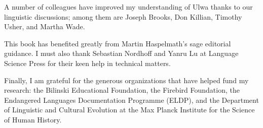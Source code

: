 A number of colleagues have improved my understanding of Ulwa thanks to our linguistic discussions; among them are Joseph Brooks, Don Killian, Timothy Usher, and Martha Wade.

This book has benefited greatly from Martin Haspelmath’s sage editorial guidance. I must also thank Sebastian Nordhoff and Yanru Lu at Language Science Press for their keen help in technical matters.

Finally, I am grateful for the generous organizations that have helped fund my research: the Bilinski Educational Foundation, the Firebird Foundation, the Endangered Languages Documentation Programme (ELDP), and the Department of Linguistic and Cultural Evolution at the Max Planck Institute for the Science of Human History.
